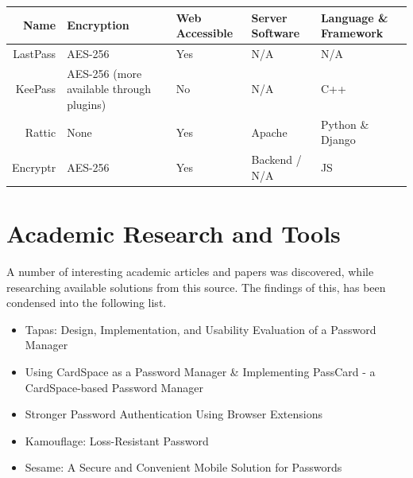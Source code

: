 			\begin{table}
				\begin{tabular}{ r l l l l }
					Name 				& Encryption  & Web Accessible 		& Server Software 		& Language \& Framework 		\\
					\hline
					LastPass 			& AES-256 		& Yes			& N/A 				& N/A \\
					KeePass 			& AES-256 (more available through plugins) & No & N/A & C++ \\
					Rattic 				& None 			& Yes 			& Apache 		& Python \& Django \\
					Encryptr 			& AES-256 		& Yes			& Backend / N/A 	& JS \\
				\end{tabular}
			\end{table}



	\section{Academic Research and Tools}
		A number of interesting academic articles and papers was discovered, while researching available solutions from this source. The findings of this, has been condensed into the following list.

		\begin{itemize}
			\item Tapas: Design, Implementation, and Usability Evaluation of a Password Manager \cite{tapas}
			\item Using CardSpace as a Password Manager \& Implementing PassCard - a CardSpace-based Password Manager \cite{cardspace,cardspace_impl}
			\item Stronger Password Authentication Using Browser Extensions
			\item Kamouflage: Loss-Resistant Password
			\item Sesame: A Secure and Convenient Mobile Solution for Passwords
		\end{itemize}
		




